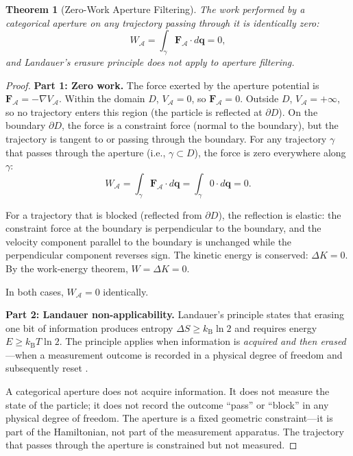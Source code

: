 \documentclass[twocolumn,10pt]{article}
\newtheorem{theorem}{Theorem}[section]
\theoremstyle{remark}
\newcommand{\kB}{k_{\mathrm{B}}}
\begin{document}
\begin{theorem}[Zero-Work Aperture Filtering]
\label{thm:zero_work}
The work performed by a categorical aperture on any trajectory passing through it is identically zero:
\begin{equation}
W_{\mathcal{A}} = \int_{\gamma} \mathbf{F}_{\mathcal{A}} \cdot d\mathbf{q} = 0,
\label{eq:zero_work}
\end{equation}
and Landauer's erasure principle does not apply to aperture filtering.
\end{theorem}

\begin{proof}
\textbf{Part 1: Zero work.}
The force exerted by the aperture potential is $\mathbf{F}_{\mathcal{A}} = -\nabla V_{\mathcal{A}}$. Within the domain $D$, $V_{\mathcal{A}} = 0$, so $\mathbf{F}_{\mathcal{A}} = 0$. Outside $D$, $V_{\mathcal{A}} = +\infty$, so no trajectory enters this region (the particle is reflected at $\partial D$). On the boundary $\partial D$, the force is a constraint force (normal to the boundary), but the trajectory is tangent to or passing through the boundary. For any trajectory $\gamma$ that passes through the aperture (i.e., $\gamma \subset D$), the force is zero everywhere along $\gamma$:
\begin{equation}
W_{\mathcal{A}} = \int_{\gamma} \mathbf{F}_{\mathcal{A}} \cdot d\mathbf{q} = \int_{\gamma} 0 \cdot d\mathbf{q} = 0.
\end{equation}

For a trajectory that is blocked (reflected from $\partial D$), the reflection is elastic: the constraint force at the boundary is perpendicular to the boundary, and the velocity component parallel to the boundary is unchanged while the perpendicular component reverses sign. The kinetic energy is conserved: $\Delta K = 0$. By the work-energy theorem, $W = \Delta K = 0$.

In both cases, $W_{\mathcal{A}} = 0$ identically.

\textbf{Part 2: Landauer non-applicability.}
Landauer's principle \cite{landauer1961} states that erasing one bit of information produces entropy $\Delta S \geq \kB \ln 2$ and requires energy $E \geq \kB T \ln 2$. The principle applies when information is \emph{acquired and then erased}---when a measurement outcome is recorded in a physical degree of freedom and subsequently reset \cite{bennett1982,szilard1929}.

A categorical aperture does not acquire information. It does not measure the state of the particle; it does not record the outcome ``pass'' or ``block'' in any physical degree of freedom. The aperture is a fixed geometric constraint---it is part of the Hamiltonian, not part of the measurement apparatus. The trajectory that passes through the aperture is constrained but not measured.


\end{proof}
\end{document}
